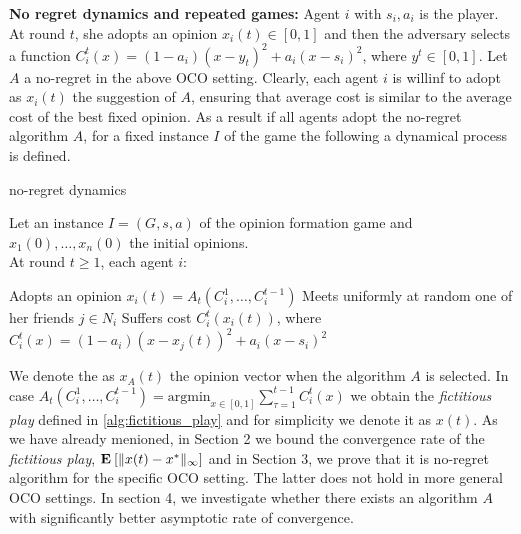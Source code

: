 \noindent \textbf{No regret dynamics and repeated games:}
\noindent Agent $i$ with $s_i,a_i$ is the player. At round $t$, she adopts an opinion $x_i(t) \in [0,1]$ and then the adversary selects a function $C_i^t(x)=(1-a_i)(x-y_t)^2 + a_i(x-s_i)^2$, where $y^t\in [0,1]$.
Let $A$ a no-regret in the above OCO setting. Clearly, each agent $i$ is willinf to adopt as $x_i(t)$ the suggestion of $A$, ensuring that average cost is similar
to the average cost of the best fixed opinion. As a result if all agents adopt the no-regret algorithm $A$, for a fixed instance $I$ of the game the following a dynamical process
is defined.
\begin{algorithm}
  \caption{no-regret dynamics}
  \label{alg:fno_regret_dynamics}
      Let an instance $I=(G,s,a)$ of the opinion formation game and $x_1(0),\ldots,x_n(0)$ the initial opinions.\\
      At round $t\geq 1$, each agent $i$:
  \begin{algorithmic}[1]
    \State Adopts an opinion $x_i(t)=A_t(C_i^1,\ldots,C_i^{t-1})$
    \State Meets uniformly at random one of her friends $j \in N_i$
    \State Suffers cost $C^t_i(x_i(t))$, where $C^t_i(x) = (1-a_i)(x-x_j(t))^2 + a_i(x-s_i)^2$
\end{algorithmic}
\end{algorithm}

\noindent We denote the as $x_A(t)$ the opinion vector when the algorithm $A$ is selected. In case $A_t(C_i^1,\ldots,C_i^{t-1})= \text{argmin}_{x \in [0,1]}\sum_{\tau=1}^{t-1}C_i^t(x)$
we obtain the \emph{fictitious play} defined in \ref{alg:fictitious_play} and for simplicity we denote it as $x(t)$. As we have already menioned, in Section 2 we
bound the convergence rate of the \emph{fictitious play}, $\Exp{\norm{\infty}{x(t)-x^*}}$ and in Section 3, we prove that it is no-regret algorithm for the specific OCO setting. The latter
does not hold in more general OCO settings. In section 4, we investigate whether there exists an algorithm $A$ with significantly better asymptotic rate of convergence.

